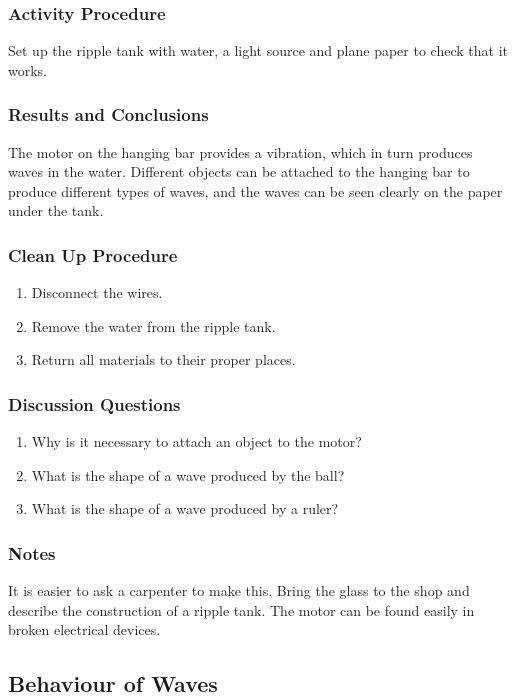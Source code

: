 \subsubsection*{Activity Procedure}
Set up the ripple tank with water, a light source and plane paper to check that it works.

\subsubsection*{Results and Conclusions}
The motor on the hanging bar provides a vibration, which in turn produces waves in the water.  Different objects can be attached to the hanging bar to produce different types of waves, and the waves can be seen clearly on the paper under the tank. 

\subsubsection*{Clean Up Procedure}
\begin{enumerate}
\item{Disconnect the wires.} 
\item{Remove the water from the ripple tank.} 
\item{Return all materials to their proper places.} 
\end{enumerate}

\subsubsection*{Discussion Questions}
\begin{enumerate}
\item{Why is it necessary to attach an object to the motor?}
\item{What is the shape of a wave produced by the ball?}
\item{What is the shape of a wave produced by a ruler?}
\end{enumerate}

\subsubsection*{Notes}
It is easier to ask a carpenter to make this. Bring the glass to the shop and describe the construction of a ripple tank. The motor can be found easily in broken electrical devices.  


\subsection{Behaviour of Waves}

